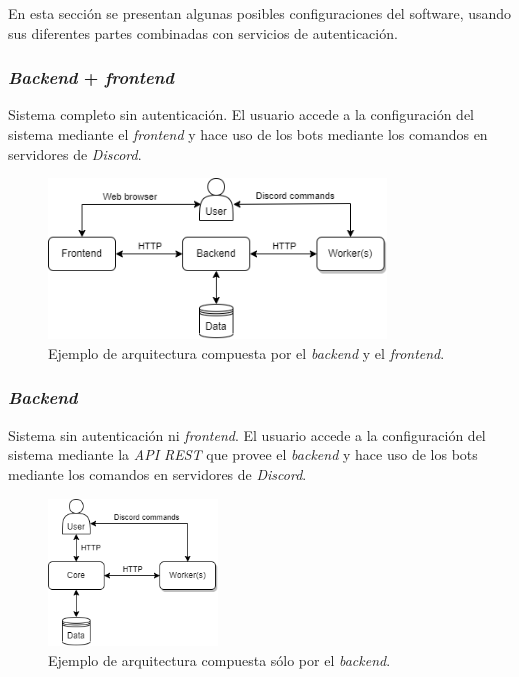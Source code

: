 En esta sección se presentan algunas posibles configuraciones del software, usando sus diferentes partes combinadas con servicios de autenticación.

\subsubsection{\textit{Backend} + \textit{frontend}}

Sistema completo sin autenticación. El usuario accede a la configuración del sistema mediante el \textit{frontend} y hace uso de los bots mediante los comandos en servidores de \textit{Discord}.

\begin{figure}[H]
	\centering
	\includegraphics[width=0.8\textwidth]{img/architecture_with_frontend.png}
	\caption{Ejemplo de arquitectura compuesta por el \textit{backend} y el \textit{frontend}.}
\end{figure}

\subsubsection{\textit{Backend}}

Sistema sin autenticación ni \textit{frontend}. El usuario accede a la configuración del sistema mediante la \textit{API REST} que provee el \textit{backend} y hace uso de los bots mediante los comandos en servidores de \textit{Discord}.

\begin{figure}[H]
	\centering
	\includegraphics[width=0.4\textwidth]{img/architecture_without_frontend.png}
	\caption{Ejemplo de arquitectura compuesta sólo por el \textit{backend}.}
\end{figure}

